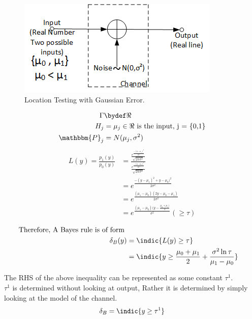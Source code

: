\documentclass[12pt]{report}
\begin{document}
\begin{itemize}
\begin{exmp}
\begin{figure}[h]
\centering
\includegraphics[scale=1]{Figures/LocationTesting}
\caption{Location Testing with Gaussian Error.}
\label{fig:LocationTest}
\end{figure}
\begin{align*}
\Gamma &\bydef \Re\\
H_j &= \mu_j \in \Re \text{ is the input, j = \{0,1\}}\\
\mathbbm{P}_j &= N(\mu_j,\sigma^2)\\
\end{align*}
{\Large
\begin{align*}
L(y)=\frac{p_1(y)}{p_0(y)}&=\frac{\frac{e^{\frac{-(y-\mu_1)^2}{{2\sigma}^2}}}{\sqrt{2\pi{\sigma}^2}}}{\frac{e^{\frac{-(y-\mu_0)^2}{{2\sigma}^2}}}{\sqrt{2\pi{\sigma}^2}}}\\
&=e^{\frac{-(y-\mu_1)^2+y-\mu_0)^2}{2{\sigma^2}}}\\
&=e^{\frac{(\mu_1-\mu_0)(2y-\mu_0-\mu_1)}{2{\sigma}^2}}\\
&=e^{\frac{(\mu_1-\mu_0)(y-\frac{\mu_0+\mu_1)}{2}}{{\sigma}^2}} (\geq \tau)\\
\end{align*}
}
\begin{align*}
\text{Therefore, A Bayes rule is of form }\\
\delta_B(y) &= \indic{L(y) \geq \tau}  \\
&=\indic{y \geq \frac {\mu_0+\mu_1}{2}+\frac{{\sigma}^2 \ln\tau}{\mu_1-\mu_0}}\\
\end{align*}


The RHS of the above inequality can be represented as some constant 
$\tau^1$.\\
$\tau^1$ 
 is determined without looking at output, Rather it is determined by simply looking at the model of the channel.\\
\begin{align*}
\delta_B&= \indic{y \geq \tau^1}\\
\end{align*}

\end{exmp}
\end{itemize}
\end{document}
